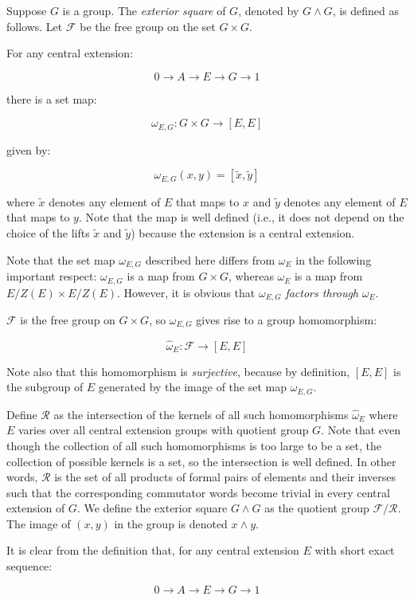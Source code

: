 \documentclass{ucetd}
\begin{document}
Suppose $G$ is a group. The {\em exterior square} of $G$, denoted by
$G \wedge G$, is defined as follows. Let $\mathcal{F}$ be the free
group on the set $G \times G$. 

For any central extension:

$$0 \to A \to E \to G \to 1$$

there is a set map:

$$\omega_{E,G}: G \times G \to [E,E]$$

given by:

$$\omega_{E,G}(x,y) = [\tilde{x},\tilde{y}]$$

where $\tilde{x}$ denotes any element of $E$ that maps to $x$ and
$\tilde{y}$ denotes any element of $E$ that maps to $y$. Note that the
map is well defined (i.e., it does not depend on the choice of the
lifts $\tilde{x}$ and $\tilde{y}$) because the extension is a central
extension.

Note that the set map $\omega_{E,G}$ described here differs from
$\omega_E$ in the following important respect: $\omega_{E,G}$ is a map
from $G \times G$, whereas $\omega_E$ is a map from $E/Z(E) \times
E/Z(E)$. However, it is obvious that $\omega_{E,G}$ {\em factors
  through} $\omega_E$.

$\mathcal{F}$ is the free group on $G \times G$, so $\omega_{E,G}$ gives rise to a group homomorphism:

$$\hat{\omega}_E:\mathcal{F} \to [E,E]$$

Note also that this homomorphism is {\em surjective}, because by
definition, $[E,E]$ is the subgroup of $E$ generated by the image of the
set map $\omega_{E,G}$.

Define $\mathcal{R}$ as the intersection of the kernels of all such
homomorphisms $\hat{\omega}_E$ where $E$ varies over all central
extension groups with quotient group $G$. Note that even though the
collection of all such homomorphisms is too large to be a set, the
collection of possible kernels is a set, so the intersection is well
defined. In other words, $\mathcal{R}$ is the set of all products of
formal pairs of elements and their inverses such that the
corresponding commutator words become trivial in every central
extension of $G$. We define the exterior square $G \wedge G$ as the
quotient group $\mathcal{F}/\mathcal{R}$. The image of $(x,y)$ in the
group is denoted $x \wedge y$.

It is clear from the definition that, for any central
extension $E$ with short exact sequence:

$$0 \to A \to E \to G \to 1$$
\end{document}
